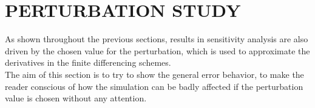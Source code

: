 \section{PERTURBATION STUDY} \label{section:perturbationstudy}
As shown throughout the previous sections, results in sensitivity analysis are also driven by the chosen value for the perturbation, which is used to approximate the derivatives in the finite differencing schemes.\\[3pt]
The aim of this section is to try to show the general error behavior, to make the reader conscious of how the simulation can be badly affected if the perturbation value is chosen without any attention.
